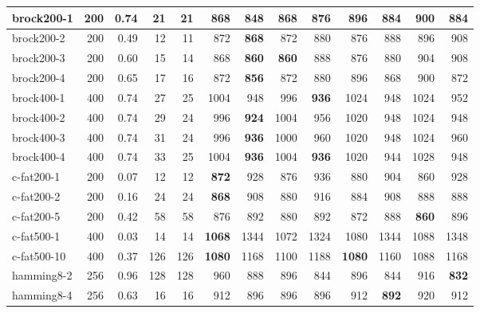 \begin{table}
{\begin{tabular}{|l|r|r|r|r|r|r|r|r||r|r|r|r|}
 \hline
    brock200-1 & 200&0.74 & 21 & 21 & 868 & \textbf{848} & 868 & 876 & 896 & 884 & 900 & 884 \\ \hline
    brock200-2 & 200&0.49 & 12 & 11 & 872 & \textbf{868} & 872 & 880 & 876 & 888 & 896 & 908 \\ \hline
    brock200-3 & 200 &0.60 & 15 & 14 & 868 & \textbf{860} & \textbf{860} & 888 & 876 & 880 & 904 & 908 \\ \hline
    brock200-4 & 200 &0.65 & 17 & 16 & 872 & \textbf{856} & 872 & 880 & 896 & 868 & 900 & 872 \\ \hline
    brock400-1 & 400 &0.74 & 27 & 25 & 1004 & 948 & 996 & \textbf{936} & 1024 & 948 & 1024 & 952 \\ \hline
    brock400-2 & 400 &0.74 & 29 & 24 & 996 & \textbf{924} & 1004 & 956 & 1020 & 948 & 1024 & 948 \\ \hline
    brock400-3 & 400 &0.74 & 31 & 24 & 996 & \textbf{936} & 1000 & 960 & 1020 & 948 & 1024 & 960 \\ \hline
    brock400-4 & 400 &0.74 &33 & 25 & 1004 & \textbf{936} & 1004 & \textbf{936} & 1020 & 944 & 1028 & 948 \\ \hline
    c-fat200-1 & 200 &0.07 &12 & 12 & \textbf{872} & 928 & 876 & 936 & 880 & 904 & 860 & 928 \\ \hline
    c-fat200-2 & 200 &0.16 &24 & 24 & \textbf{868} & 908 & 880 & 916 & 884 & 908 & 888 & 888 \\ \hline
    c-fat200-5 & 200 &0.42 &58 & 58 & 876 & 892 & 880 & 892 & 872 & 888 & \textbf{860} & 896 \\ \hline
    c-fat500-1 & 400 &0.03 &14 & 14 & \textbf{1068} & 1344 & 1072 & 1324 & 1080 & 1344 & 1088 & 1348 \\ \hline
    c-fat500-10 & 400&0.37 &126 & 126 & \textbf{1080} & 1168 & 1100 & 1188 & \textbf{1080} & 1160 & 1088 & 1168 \\ \hline
    hamming8-2 & 256 &0.96 &128 & 128 & 960 & 888 & 896 & 844 & 896 & 844 & 916 & \textbf{832} \\ \hline
    hamming8-4 & 256 &0.63 &16 & 16 & 912 & 896 & 896 & 896 & 912 & \textbf{892} & 920 & 912 \\ \hline

\end{tabular}}
\end{table}
